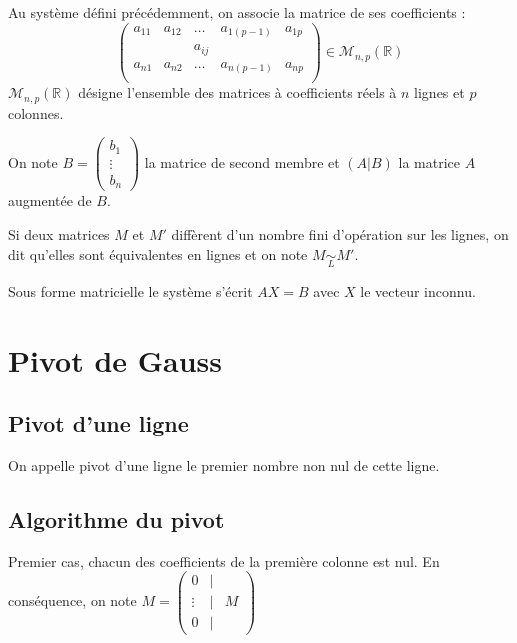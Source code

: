 \documentclass[10pt]{article}
\begin{document}
\begin{defi}
Au système défini précédemment, on associe la matrice de ses coefficients :
$$
\begin{pmatrix}
a_{11} & a_{12} & \ldots & a_{1(p-1)} & a_{1p} \\
 & & a_{ij} & & \\
a_{n1} & a_{n2} & \ldots & a_{n(p-1)} & a_{np} \\
\end{pmatrix} \in \mathcal{M}_{n,p}(\mathbb{R})
$$
$\mathcal{M}_{n,p}(\mathbb{R})$ désigne l'ensemble des matrices à coefficients réels à $n$ lignes et $p$ colonnes. 
\end{defi}

\begin{defi}
On note $B=\begin{pmatrix} b_1 \\ \vdots \\ b_n \end{pmatrix}$ la matrice de second membre et $(A|B)$ la matrice $A$ augmentée de $B$. 
\end{defi}


\begin{defi}
Si deux matrices $M$ et $M'$ diffèrent d'un nombre fini d'opération sur les lignes, on dit qu'elles sont équivalentes en lignes et on note $M \underset{L}{\sim} M'$. 
\end{defi}

\begin{rem}
Sous forme matricielle le système s'écrit $AX=B$ avec $X$ le vecteur inconnu. 
\end{rem}


\section{Pivot de Gauss}
\subsection{Pivot d'une ligne}
\begin{defi}
On appelle pivot d'une ligne le premier nombre non nul de cette ligne. 
\end{defi}

\subsection{Algorithme du pivot}
Premier cas, chacun des coefficients de la première colonne est nul. En conséquence, on note 
$M = \begin{pmatrix} 0 & | &  \\ \vdots & | & M \\ 0 & | &  \end{pmatrix}$ 
\end{document}
